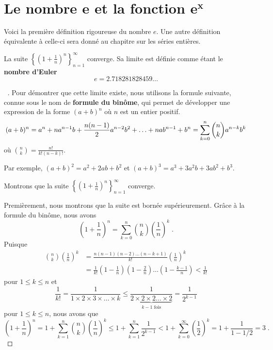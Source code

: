 {\section{Le nombre $\mathbf{e}$ et la fonction $\mathbf{e^x}$}\label{nbrE}


Voici la première définition rigoureuse du nombre $e$.  Une autre
définition équivalente à celle-ci sera donné au chapitre sur les
séries entières.

\begin{theorem}
La suite
$\displaystyle \left\{\left(1+\frac{1}{n}\right)^n\right\}_{n=1}^\infty$ 
converge.  Sa limite est définie comme étant le {\bfseries nombre
d'Euler}
\[
e=2.718281828459\ldots
\]
\label{limitDefe}
\end{theorem}

\begin{proof}[\UOproof\ \theory]
Pour démontrer que cette limite existe, nous utilisons la formule
suivante, connue sous le nom de
{\bfseries formule du binôme}, 
qui permet de développer une expression de la forme $(a+b)^n$ où $n$
est un entier positif.
\[
(a+b)^n = a^n + n a^{n-1}b + \frac{n(n-1)}{2}a^{n-2}b^2 + \ldots
+ n a b^{n-1} + b^n \\
= \sum_{k=0}^n \binom{n}{k} a^{n-k} b^k
\]
où $\displaystyle \binom{n}{k} = \frac{n!}{k!(n-k)!}$.

Par exemple, $\displaystyle (a+b)^2 = a^2 + 2ab + b^2$
et $\displaystyle (a+b)^3 = a^3 + 3a^2b + 3ab^2 + b^3$.

Montrons que la suite
$\displaystyle \left\{\left(1+\frac{1}{n}\right)^n\right\}_{n=1}^\infty$ 
converge.

Premièrement, nous montrons que la suite est bornée supérieurement.  Grâce
à la formule du binôme, nous avons
\[
\left( 1 + \frac{1}{n} \right)^n = \sum_{k=0}^n \binom{n}{k}
\left(\frac{1}{n}\right)^k \; .
\]
Puisque
\begin{align*}
\binom{n}{k} \left(\frac{1}{n}\right)^k
&= \frac{n(n-1)(n-2)\ldots(n-k+1)}{k!}\left(\frac{1}{n}\right)^k \\
&= \frac{1}{k!}\left(1-\frac{1}{n}\right)\left(1 - \frac{2}{n}\right)\ldots
\left(1-\frac{k-1}{n}\right)
< \frac{1}{k!}
\end{align*}
pour $1\leq k \leq n$ et
\[
\frac{1}{k!} = \frac{1}{1\times 2\times 3\times \ldots\times k} \leq
\frac{1}{\underbrace{2\times 2 \times 2 \ldots \times 2}_{k-1\text{ fois}}}
 = \frac{1}{2^{k-1}}
\]
pour $1\leq k \leq n$, nous avons que
\[
\left( 1 + \frac{1}{n} \right)^n 
= 1 + \sum_{k=1}^n \binom{n}{k} \left(\frac{1}{n}\right)^k
\leq 1 + \sum_{k=1}^n \frac{1}{2^{k-1}}
< 1 + \sum_{k=0}^\infty \left(\frac{1}{2}\right)^k
= 1 + \frac{1}{1-1/2} = 3 \; .
\]


\end{proof}}
